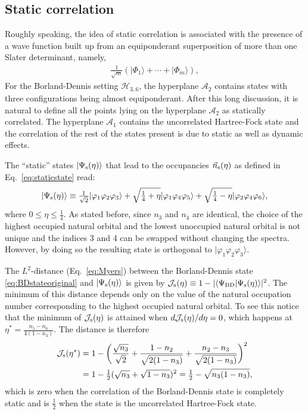 \documentclass[aps,twocolumn,showpacs,pra,superscriptaddress,floatfix,longbibliography]{revtex4-1}
\newcommand{\7}{\dagger}
\newcommand{\ket}[1]{\mbox{$| #1 \rangle$}}
\renewcommand{\H}{\mathcal{H}}
\begin{document}
   \subsection{Static correlation}
   
Roughly speaking, the idea of static correlation 
is associated with the presence of a wave function built up 
from an equiponderant superposition of more than one 
Slater determinant, namely,
\begin{align}
\label{eq:equiponder}
\frac1{\sqrt{m}}(\ket{\Phi_1} + \cdots + \ket{\Phi_m}),
\end{align}
For the Borland-Dennis setting $\H_{3,6}$, the hyperplane 
$\mathcal{A}_2$ contains states with three
configurations being almost equiponderant. 
After this long discussion, it is natural to
define all the points lying on the hyperplane $\mathcal{A}_2$
as statically correlated.
The hyperplane $\mathcal{A}_1$ contains the uncorrelated 
Hartree-Fock state and the correlation of the rest of 
the states present is due to static as well as dynamic effects.

The ``static'' states $\ket{\Psi_{\rm s}(\eta)}$ that lead to the
occupancies $\vec n_{\rm s}(\eta)$ as defined in Eq.~\eqref{eq:staticstate}
read:
\begin{equation}
\ket{\Psi_{\rm s}(\eta)} \equiv
\tfrac1{\sqrt{2}} \ket{\varphi_1\varphi_2\varphi_3} 
+ \sqrt{\tfrac14 + \eta}\ket{\varphi_1\varphi_4\varphi_5} +
\sqrt{\tfrac14 - \eta}\ket{\varphi_2\varphi_4\varphi_6},
\end{equation}
where $0 \leq \eta \leq \tfrac14$. As stated before, since 
$n_3$ and $n_4$ are identical, the choice of the highest 
occupied natural orbital and the lowest unoccupied natural 
orbital is not unique and the indices 3 and 4 can be swapped 
without changing the spectra. However, by doing so the resulting
state is orthogonal to $\ket{\varphi_1\varphi_2\varphi_3}$.

The $L^2$-distance 
(Eq.~\eqref{eq:Myers})
between the Borland-Dennis state 
\eqref{eq:BDstateoriginal} and $\ket{\Psi_{\rm s}(\eta)}$ is 
given by $\mathcal{J}_{\rm s}(\eta) \equiv 1 - 
|\langle\Psi_{\rm BD}\ket{\Psi_{\rm s}(\eta)}|^2$. 
The minimum of this distance depends only on the value of 
the natural occupation number corresponding to the highest
occupied natural orbital. To see this notice that the minimum 
of $\mathcal{J}_{\rm s}(\eta)$ is attained when 
$d\mathcal{J}_{\rm s}(\eta)/d\eta = 0$, which happens 
at
$
\eta^{*} = \frac{n_5 - n_6}{4(1 - n_3)}.
$
The distance is therefore
\begin{align}
\mathcal{J}_{\rm s}(\eta^{*}) &= 1 - 
\bigg(\frac{\sqrt{n_3}}{\sqrt{2}} + \frac{1-n_2}{\sqrt{2(1-n_3)}}
+ \frac{n_2-n_3}{\sqrt{2(1-n_3)}}\bigg)^2 
\nonumber \\
&= 1 - \tfrac12(\sqrt{n_3} + \sqrt{1-n_3})^2 = \tfrac12 - \sqrt{n_3(1-n_3)},
\end{align}
which is zero when the correlation of the 
Borland-Dennis state is completely static and 
is $\tfrac12$ when the state is the uncorrelated
Hartree-Fock state. 
\end{document}
